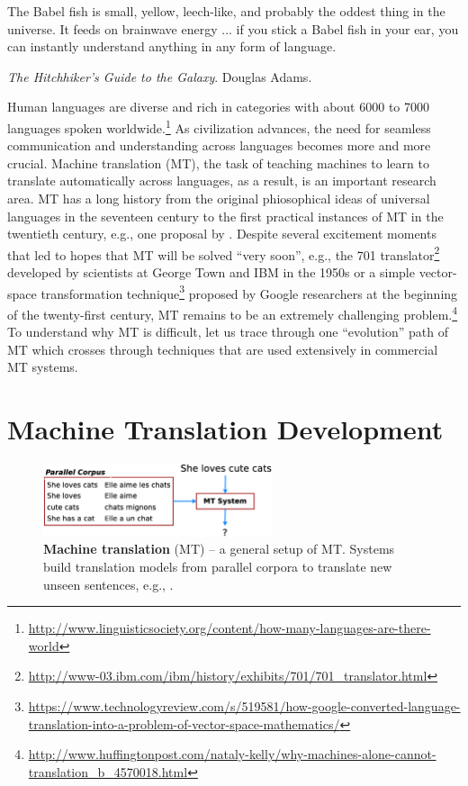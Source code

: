 \epigraph{The Babel fish is small, yellow, leech-like, and probably the oddest
thing in the universe. It feeds on brainwave energy  ...
if you stick a Babel fish in your ear, you can
instantly understand anything in any form of language.}{{\it The Hitchhiker's
Guide to the Galaxy}.
Douglas Adams.}
Human languages are diverse and rich in categories with about 6000 to 7000
languages spoken worldwide.\footnote{\url{http://www.linguisticsociety.org/content/how-many-languages-are-there-world}}
As civilization advances, the need for seamless communication and understanding across
languages becomes more and more crucial. Machine translation (MT), the
task of teaching machines to learn to translate automatically across languages, as
a result, is an important research area.
MT has a long history \cite{hutchins07} from the original
phiosophical ideas of universal languages in the seventeen century to the 
first practical instances of MT in the twentieth century, e.g., one proposal by
. Despite several excitement moments that led to hopes that MT
will be solved ``very soon'', e.g., the 701 translator\footnote{\url{http://www-03.ibm.com/ibm/history/exhibits/701/701_translator.html}}
developed by scientists at George Town and IBM in the 1950s or a simple
vector-space transformation
technique\footnote{\url{https://www.technologyreview.com/s/519581/how-google-converted-language-translation-into-a-problem-of-vector-space-mathematics/}} proposed by Google researchers at the beginning of the twenty-first
century,
MT remains to be an extremely challenging
problem.\footnote{\url{http://www.huffingtonpost.com/nataly-kelly/why-machines-alone-cannot-translation_b_4570018.html}}
To understand why MT is difficult, let us trace through one ``evolution''
path of %
MT which crosses through techniques that are used extensively in
commercial MT systems. 

\section{Machine Translation Development}
\begin{figure}
\centering
\includegraphics[width=0.6\textwidth, clip=true, trim= 0 0 0 0]{img/mt.eps} %
\caption[A general setup of machine translation]{{\bf Machine translation} (MT) -- a general setup of MT. Systems
build translation models from parallel corpora to translate new unseen
sentences, e.g., .}
\label{f:mt}
\end{figure}

